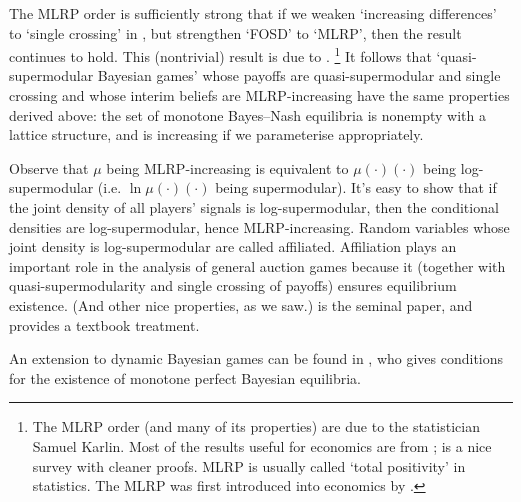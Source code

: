 \documentclass[11pt,letterpaper,reqno,oneside]{article}
\begin{document}


The MLRP order is sufficiently strong that if we weaken `increasing differences' to `single crossing' in , but strengthen `FOSD' to `MLRP', then the result continues to hold. This (nontrivial) result is due to \textcite{KarlinRubin1956}.%
	\footnote{The MLRP order (and many of its properties) are due to the statistician Samuel Karlin. Most of the results useful for economics are from \textcite{KarlinRubin1956}; \textcite{KarlinRinott1980} is a nice survey with cleaner proofs. MLRP is usually called `total positivity' in statistics. The MLRP was first introduced into economics by \textcite{Milgrom1981bell}.}
It follows that `quasi-supermodular Bayesian games' whose payoffs are quasi-supermodular and single crossing and whose interim beliefs are MLRP-increasing have the same properties derived above: the set of monotone Bayes--Nash equilibria is nonempty with a lattice structure, and is increasing if we parameterise appropriately.

Observe that $\mu$ being MLRP-increasing is equivalent to $\mu(\cdot)(\cdot)$ being log-supermodular (i.e. $\ln \mu(\cdot)(\cdot)$ being supermodular). It's easy to show that if the joint density of all players' signals is log-supermodular, then the conditional densities are log-supermodular, hence MLRP-increasing. Random variables whose joint density is log-supermodular are called affiliated. Affiliation plays an important role in the analysis of general auction games because it (together with quasi-supermodularity and single crossing of payoffs) ensures equilibrium existence. (And other nice properties, as we saw.) \textcite{MilgromWeber1982} is the seminal paper, and \textcite[][ch. 6]{Krishna2010} provides a textbook treatment.

An extension to dynamic Bayesian games can be found in \textcite{Mensch2020}, who gives conditions for the existence of monotone perfect Bayesian equilibria.



\pagebreak
\end{document}

